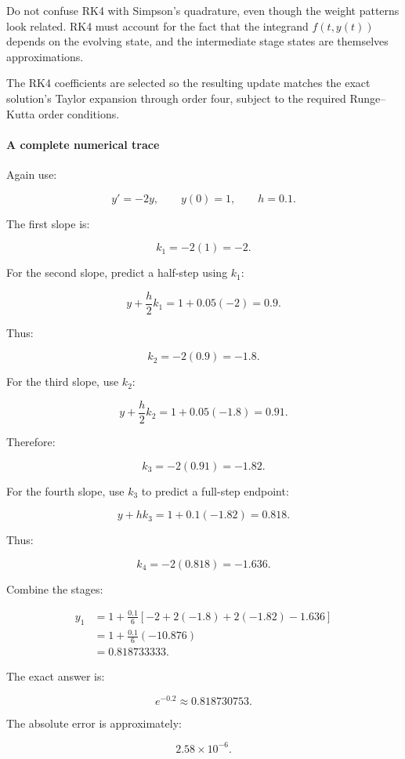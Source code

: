 Do not confuse RK4 with Simpson's quadrature, even though the weight patterns look related. RK4 must account for the fact that the integrand \(f(t,y(t))\) depends on the evolving state, and the intermediate stage states are themselves approximations.

The RK4 coefficients are selected so the resulting update matches the exact solution's Taylor expansion through order four, subject to the required Runge--Kutta order conditions.

\paragraph{A complete numerical trace}\label{02-foundations-ii-ch025-a-complete-numerical-trace}

Again use:

\[
y'=-2y,\qquad y(0)=1,\qquad h=0.1.
\]

The first slope is:

\[
k_1=-2(1)=-2.
\]

For the second slope, predict a half-step using \(k_1\):

\[
y+\frac h2k_1 = 1+0.05(-2)=0.9.
\]

Thus:

\[
k_2=-2(0.9)=-1.8.
\]

For the third slope, use \(k_2\):

\[
y+\frac h2k_2 = 1+0.05(-1.8)=0.91.
\]

Therefore:

\[
k_3=-2(0.91)=-1.82.
\]

For the fourth slope, use \(k_3\) to predict a full-step endpoint:

\[
y+hk_3=1+0.1(-1.82)=0.818.
\]

Thus:

\[
k_4=-2(0.818)=-1.636.
\]

Combine the stages:

\[
\begin{aligned} y_1 &=1+\frac{0.1}{6} [-2+2(-1.8)+2(-1.82)-1.636]\\ &=1+\frac{0.1}{6}(-10.876)\\ &=\boxed{0.818733333}. \end{aligned}
\]

The exact answer is:

\[
e^{-0.2}\approx0.818730753.
\]

The absolute error is approximately:

\[
2.58\times10^{-6}.
\]


